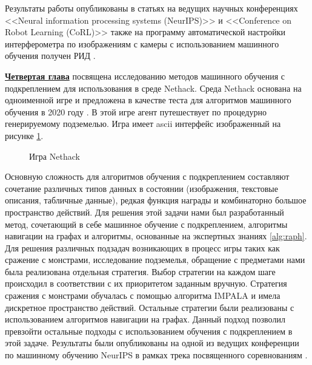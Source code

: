 Результаты работы опубликованы в статьях \cite{confbib1, confbib2} на ведущих научных конференциях <<Neural information processing systems (NeurIPS)>> и <<Conference on Robot Learning (CoRL)>> также на программу автоматической настройки интерферометра по изображениям с камеры с использованием машинного обучения получен РИД \cite{progbib1}.

\underline{\textbf{Четвертая глава}} посвящена исследованию методов машинного обучения с подкреплением для использования в среде Nethack. Среда Nethack основана на одноименной игре и предложена в качестве теста для алгоритмов машинного обучения в 2020 году \cite{nethack}. В этой игре агент путешествует по процедурно генерируемому подземелью. Игра имеет ascii интерфейс изображенный на рисунке \ref{fig:nethack}.

\begin{figure}[ht]
    \caption{Игра Nethack}\label{fig:nethack}
\end{figure}

Основную сложность для алгоритмов обучения с подкреплением составляют сочетание различных типов данных в состоянии (изображения, текстовые описания, табличные данные), редкая функция награды и комбинаторно большое пространство действий. Для решения этой задачи нами был разработанный метод, сочетающий в себе машинное обучение с подкреплением, алгоритмы навигации на графах и алгоритмы, основанные на экспертных знаниях \ref{alg:raph}. Для решения различных подзадач возникающих в процесс игры таких как сражение с монстрами, исследование подземелья, обращение с предметами нами была реализована отдельная стратегия. Выбор стратегии на каждом шаге происходил в соответствии с их приоритетом заданным вручную. Стратегия сражения с монстрами обучалась с помощью алгоритма IMPALA \cite{impala} и имела дискретное пространство действий. Остальные стратегии были реализованы с использованием алгоритмов навигации на графах. Данный подход позволил превзойти остальные подходы с использованием обучения с подкреплением в этой задаче. Результаты были опубликованы на одной из ведущих конференции по машинному обучению NeurIPS в рамках трека посвященного соревнованиям \autocite{confbib3}.


